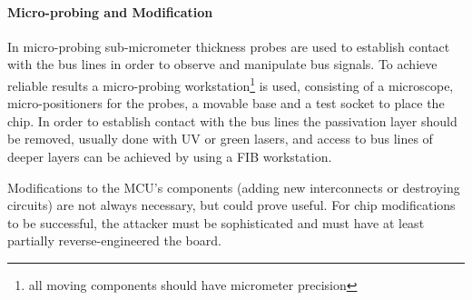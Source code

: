 	\paragraph{Micro-probing and Modification} In micro-probing sub-micrometer thickness probes are used to establish contact with the bus lines in order to observe and manipulate bus signals. To achieve reliable results a micro-probing workstation\footnote{all moving components should have micrometer precision} is used, consisting of a microscope, micro-positioners for the probes, a movable base and a test socket to place the chip. In order to establish contact with the bus lines the passivation layer should be removed, usually done with UV or green lasers, and access to bus lines of deeper layers can be achieved by using a FIB workstation.
	
	Modifications to the MCU's components (adding new interconnects or destroying circuits) are not always necessary, but could prove useful\citep{anderson:tamper_resistance}. For chip modifications to be successful, the attacker must be sophisticated and must have at least partially reverse-engineered the board.
